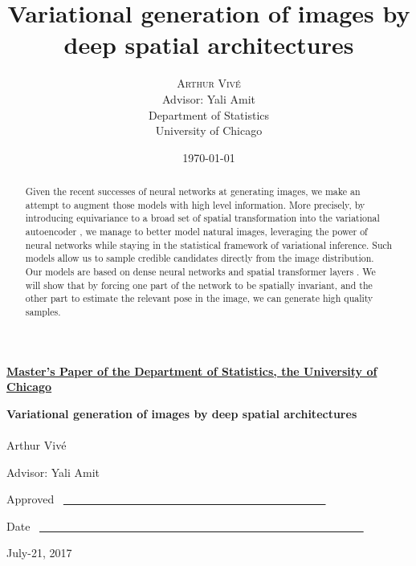 \documentclass[letterpaper, twoside]{article}
\title{Variational generation of images by deep spatial architectures} %
\author{%
\textsc{Arthur Viv\'e} \\%
Advisor: Yali Amit \\
Department of Statistics\\
University of Chicago \\ %
}
\date{\today} %
\begin{document}
\noindent
\thispagestyle{empty}
\underline{\bf Master's Paper of the Department of Statistics, the
  University of Chicago}

\vspace{1.8in}
\begin{center}
{\bf\LARGE Variational generation of images by deep spatial architectures}
\\~\\


\vspace{1.4in}
{\Large Arthur Viv\'e}

\vspace{1.3in}
{\Large Advisor: Yali Amit \\}

\end{center}

\vspace{.6in}
{\Large Approved} ~\underline{~~~~~~~~~~~~~~~~~~
\small ~~~~~~~~~~~~~~~~~~~~~~~~~~~~}

\vspace{.2in}
{\Large Date} ~\underline{~~~~~~~~~~~~~~~~~~~~~~~~~~
{\small }~~~~~~~~~~~~~~~~~~~~~~~~~~~~~~~}

\vfill
\begin{center}{\large July-21, 2017}\end{center}

\newpage
\pagestyle{plain}
\setcounter{page}{1}

\begin{abstract}

\vspace{7mm}\noindent Given the recent successes of neural networks at generating images, we make an attempt to augment those models with high level information. More precisely, by introducing equivariance to a broad set of spatial transformation into the variational autoencoder \cite{Kingma.aevb}, we manage to better model natural images, leveraging the power of neural networks while staying in the statistical framework of variational inference. Such models allow us to sample credible candidates directly from the image distribution. Our models are based on dense neural networks and spatial transformer layers \cite{Jaderberg.stn}. We will show that by forcing one part of the network to be spatially invariant, and the other part to estimate the relevant pose in the image, we can generate high quality samples.
\end{abstract}

\tableofcontents
\end{document}

